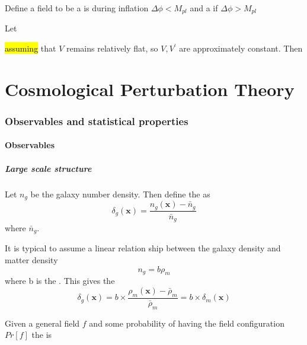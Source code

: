 \documentclass{article}
\begin{document}
\begin{definition}
Define a field to be a  is during inflation $\Delta \phi < M_{pl}$ and a  if $\Delta \phi > M_{pl}$
\end{definition}

\begin{definition}
Let 
\end{definition}
\hl{assuming} that $V$ remains relatively flat, so $V,V^\prime$ are approximately constant. Then 

\part{Cosmological Perturbation Theory}
\section{Observables and statistical properties}
\subsection{Observables}
\subsubsection*{Large scale structure}
\begin{definition}
Let $n_g$ be the galaxy number density. Then define the  as 
\[
\delta_g(\bm{x}) = \frac{n_g(\bm{x})-\bar{n}_g}{\bar{n}_g}
\]
where $\bar{n}_g$. 
\end{definition}

It is typical to assume a linear relation ship between the galaxy density and matter density 
\[
n_g = b \rho_m
\]
where b is the . This gives the 
\[
\delta_g(\bm{x}) = b \times \frac{\rho_m(\bm{x})-\bar{\rho}_m}{\bar{\rho}_m} = b \times \delta_m(\bm{x})
\]

\begin{definition}
Given a general field $f$ and some probability of having the field configuration $Pr[f]$ the  is 
\end{definition}
\end{document}
